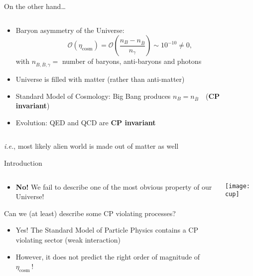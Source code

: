 \begin{frame}{On the other hand\ldots}
    \begin{columns}[T]
        \begin{column}{.6\textwidth}
            \begin{itemize}
				\item Baryon asymmetry of the Universe:
                \begin{equation*}
                    \mathcal{O}(\eta_\text{cosm}) = \mathcal{O} \! \left( \frac{n_B - n_{\overline{B}}}{n_\gamma} \right) \sim 10^{-10} \neq 0,
                \end{equation*}
                with $n_{B,\overline{B},\gamma}=$ number of baryons, anti-baryons and photons
                \item Universe is filled with matter (rather than anti-matter\ftnt)
                \item Standard Model of Cosmology: Big Bang produces $n_B = n_{\overline{B}}$~~(\textbf{CP invariant})
                \item Evolution: QED and QCD are \textbf{CP invariant}
            \end{itemize}
        \end{column}
        \begin{column}{.4\textwidth}
        \end{column}
    \end{columns}

    \vspace{5mm}
    \footnotesize \ftnt{} \textit{i.e.}, most likely alien world is made out of matter as well
\end{frame}

\begin{frame}{Introduction}
    \begin{columns}[T]
        \begin{column}{.6\textwidth}
            \begin{itemize}
                \item \textbf{No!} We fail to describe one of the most obvious property of our Universe!
            \end{itemize}
            Can we (at least) describe some CP violating processes?
            \begin{itemize}
                \item Yes! The Standard Model of Particle Physics contains a CP violating sector (weak interaction)
                \item However, it does not predict the right order of magnitude of $\eta_\text{cosm}$\,!
            \end{itemize}
        \end{column}
        \begin{column}{.4\textwidth}
            \centering
            \texttt{[image: cup]}
        \end{column}
    \end{columns}
\end{frame}

